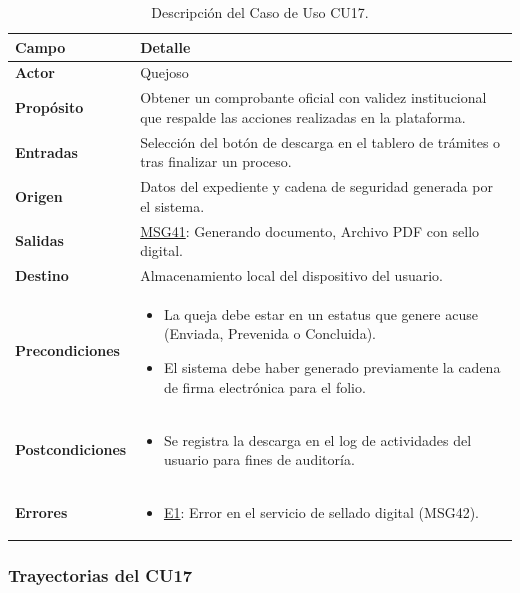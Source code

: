 \begin{appendices}
\begin{table}[htbp]
\centering
\small
{}
\begin{tabular}{|p{3.5cm}|p{10.5cm}|}
\hline
\rowcolor[HTML]{EFEFEF} 
\textbf{Campo} & \textbf{Detalle} \\ \hline
\textbf{Actor} & Quejoso \\ \hline
\textbf{Propósito} & Obtener un comprobante oficial con validez institucional que respalde las acciones realizadas en la plataforma. \\ \hline
\textbf{Entradas} & Selección del botón de descarga en el tablero de trámites o tras finalizar un proceso. \\ \hline
\textbf{Origen} & Datos del expediente y cadena de seguridad generada por el sistema. \\ \hline
\textbf{Salidas} & \hyperlink{msg:MSG41}{MSG41}: Generando documento, Archivo PDF con sello digital. \\ \hline
\textbf{Destino} & Almacenamiento local del dispositivo del usuario. \\ \hline
\textbf{Precondiciones} & 
\begin{itemize}[nosep, leftmargin=*]
    \item La queja debe estar en un estatus que genere acuse (Enviada, Prevenida o Concluida).
    \item El sistema debe haber generado previamente la cadena de firma electrónica para el folio.
\end{itemize} \\ \hline
\textbf{Postcondiciones} & 
\begin{itemize}[nosep, leftmargin=*]
    \item Se registra la descarga en el log de actividades del usuario para fines de auditoría.
\end{itemize} \\ \hline
\textbf{Errores} & 
\begin{itemize}[nosep, leftmargin=*]
    \item \hyperlink{err:E22}{E1}: Error en el servicio de sellado digital (MSG42).
\end{itemize} \\ \hline
\end{tabular}
\caption{Descripción del Caso de Uso CU17.}
\label{tab:cu17_especificacion}
\end{table}

\subsubsection{Trayectorias del CU17}


\end{appendices}
